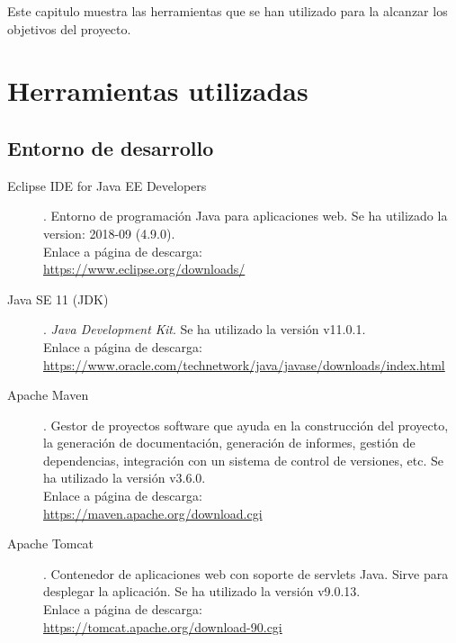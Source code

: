 
Este capitulo muestra las herramientas que se han utilizado para la alcanzar los objetivos del proyecto.
\section{Herramientas utilizadas}
\subsection{Entorno de desarrollo}
\begin{description}
	\item[Eclipse IDE for Java EE Developers]. Entorno de programación Java para aplicaciones web. Se ha utilizado la version: 2018-09 (4.9.0).\\ Enlace a página de descarga:\\ \url{https://www.eclipse.org/downloads/}
	\item[Java SE 11 (JDK)]. \textit{Java Development Kit}. Se ha utilizado la versión  v11.0.1.\\ Enlace a página de descarga:\\ \url{https://www.oracle.com/technetwork/java/javase/downloads/index.html}
	\item[Apache Maven]. Gestor de proyectos software que ayuda en la construcción del proyecto, la generación de documentación, generación de informes, gestión de dependencias, integración con un sistema de control de versiones, etc. Se ha utilizado la versión  v3.6.0.\\ Enlace a página de descarga:\\ \url{https://maven.apache.org/download.cgi}
	\item[Apache Tomcat]. Contenedor de aplicaciones web con soporte de servlets Java. Sirve para desplegar la aplicación. Se ha utilizado la versión  v9.0.13.\\ Enlace a página de descarga:\\ \url{https://tomcat.apache.org/download-90.cgi}
\end{description}
